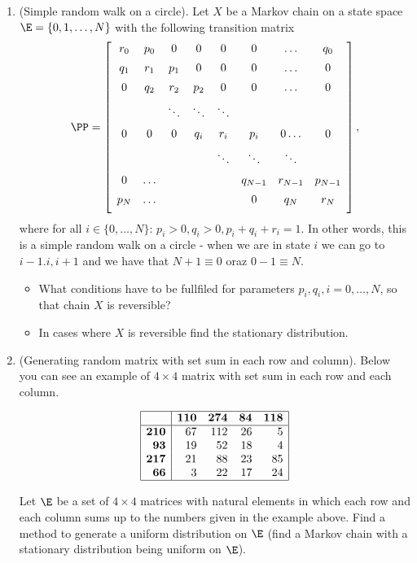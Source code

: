 \documentclass[a4paper,12pt]{article}
\begin{document}
\begin{enumerate}
  
  \item  (Simple random walk on a circle). Let $X$ be a Markov chain on a state space $\E=\{0,1,\ldots,N\}$ with the following transition matrix
$$\PP=\left[
\begin{array}{ccccccccc}
r_0 & p_0 & 0 & 0 & 0  & 0 &\ldots & q_0 \\[5pt]
q_1 & r_1 & p_1 & 0 & 0 & 0 &\ldots & 0 \\[5pt]
0 & q_2 & r_2 & p_2 & 0 & 0 &\ldots & 0\\[5pt]
  &      & \ddots& \ddots& \ddots\\[5pt]
0 & 0 & 0 & q_i & r_i & p_i &0 \ldots &0 \\[5pt]
 &  & &      & \ddots& \ddots& \ddots\\[5pt]
 0&\ldots &  & &      & q_{N-1} & r_{N-1} & p_{N-1} \\[5pt]
 p_N&\ldots &  & &      & 0 & q_N & r_N \\[5pt]
    \end{array}\right],$$
where for all $i\in\{0,\ldots,N\}$: $p_i>0, q_i>0, p_i+q_i+r_i=1$. In other words, this is a simple random walk on a circle - when we are in state $i$ we can go to $i-1. i, i+1$ and we have that $N+1 \equiv 0$ oraz $0-1\equiv N.$
\begin{itemize}
     \item What conditions have to be fullfiled for parameters $p_i,q_i, i=0,\ldots,N$, so that chain $X$ is reversible?
     \item In cases where $X$ is reversible find the stationary distribution.
\end{itemize}

 \item 
  (Generating random matrix with set sum in each row and column). Below you can see an example of $4 \times 4$ matrix with set sum in each row and each column.
\begin{figure}[H]
 $$
 \begin{array}{|r|rrrr|}\hline
  &\textbf{110} & \textbf{274} & \textbf{84} &\textbf{118} \\\hline
\textbf{210} & 67 & 112 & 26  & 5 \\
\textbf{93} & 19 & 52 & 18 &  4\\
\textbf{217} & 21 & 88 & 23 & 85 \\
\textbf{66} & 3 & 22 & 17  & 24\\\hline

 \end{array}
$$
\end{figure}
Let $\E$ be a set of $4\times 4$ matrices with natural elements in which each row and each column sums up to the numbers given in the example above. Find a method to generate a uniform distribution on $\E$ (find a Markov chain with a stationary distribution being uniform on $\E$).


\end{enumerate}
\end{document}
